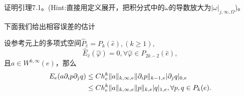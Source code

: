 \begin{exercise}
    证明引理7.1。(Hint:直接用定义展开，把积分式中的$\omega$的导数放大为$|\omega|_{j,\infty,\Omega}$)。
\end{exercise}
下面我们给出相容误差的估计
\begin{theorem}
    \label{thm:approx_err_1}
    设参考元上的多项式空间$\hat{P}_{\hat{e}}=P_{k}(\hat{e}),(k\ge 1),$
    \begin{equation}
        \hat{E}_{\hat{e}}(\hat{\varphi})=0,\forall\hat{\varphi}\in P_{2k-2}(\hat{e}),
    \end{equation}
    且$a\in W^{k,\infty}(e)$，那么
    \begin{equation}
        \begin{aligned}
            E_{e}(a\partial_{i}p\partial_{j}q)&\le Ch_{e}^{k}\|a\|_{k,\infty,e}\|\partial_{i}p\|_{k-1,e}|\partial_{j}q|_{0,e}\\
            &\le Ch_{e}^{k}\|a\|_{k,\infty,e}\|p\|_{k,e}|q|_{1,e},\forall p,q\in P_{k}(e).
        \end{aligned}
    \end{equation}
\end{theorem}
